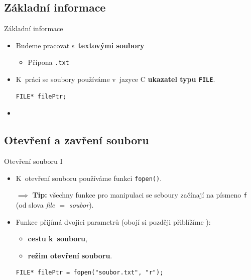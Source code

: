 \documentclass[14pt,aspectratio=169]{beamer}
\begin{document}
    \subsection{Základní informace}
    \begin{frame}[t,fragile]{Základní informace}
        \begin{itemize}
            \item Budeme pracovat s~\textbf{textovými soubory}
            \begin{itemize}
                \item Přípona \texttt{.txt}
            \end{itemize}
            \item K~práci se soubory používáme v~jazyce C \textbf{ukazatel typu \texttt{FILE}}.
            \begin{lstlisting}
FILE* filePtr;
            \end{lstlisting}
            \item {}
        \end{itemize}
    \end{frame}

    \subsection{Otevření a zavření souboru}
    \begin{frame}[t,fragile]{Otevření souboru \textrm{I}}
        \begin{itemize}
            \item K~otevření souboru používáme funkci \texttt{fopen()}.
            \begin{center}
                $\implies$ \textbf{Tip:} všechny funkce pro manipulaci se seboury začínají na písmeno \texttt{f} (od slova \emph{file $=$ soubor}).
            \end{center}
            \item Funkce přijímá dvojici parametrů (obojí si později přiblížíme ):
            \begin{itemize}
                \item \textbf{cestu k~souboru},
                \item \textbf{režim otevření souboru}.
            \end{itemize}
            \begin{lstlisting}
FILE* filePtr = fopen("soubor.txt", "r");
            \end{lstlisting}
        \end{itemize}
    \end{frame}
\end{document}
